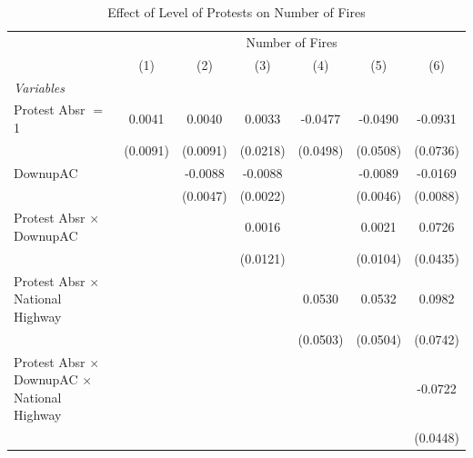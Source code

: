 
\begin{table}[htbp]
   \caption{\label{tab:protest_treat_main} Effect of Level of Protests on Number of Fires}
   \centering
   \begin{tabular}{lcccccc}
      \tabularnewline \midrule \midrule
       & \multicolumn{6}{c}{Number of Fires}\\
                                                                 & (1)           & (2)           & (3)           & (4)           & (5)           & (6)\\  
      \midrule
      \emph{Variables}\\
      Protest Absr $=$ 1                                         & 0.0041        & 0.0040        & 0.0033        & -0.0477       & -0.0490       & -0.0931\\   
                                                                 & (0.0091)      & (0.0091)      & (0.0218)      & (0.0498)      & (0.0508)      & (0.0736)\\   
      DownupAC                                                   &               & -0.0088       & -0.0088       &               & -0.0089       & -0.0169\\   
                                                                 &               & (0.0047)      & (0.0022)      &               & (0.0046)      & (0.0088)\\   
      Protest Absr $\times$ DownupAC                             &               &               & 0.0016        &               & 0.0021        & 0.0726\\   
                                                                 &               &               & (0.0121)      &               & (0.0104)      & (0.0435)\\   
      Protest Absr $\times$ National Highway                     &               &               &               & 0.0530        & 0.0532        & 0.0982\\   
                                                                 &               &               &               & (0.0503)      & (0.0504)      & (0.0742)\\   
      Protest Absr $\times$ DownupAC $\times$ National Highway   &               &               &               &               &               & -0.0722\\   
                                                                 &               &               &               &               &               & (0.0448)\\   

\end{tabular}
\end{table}
